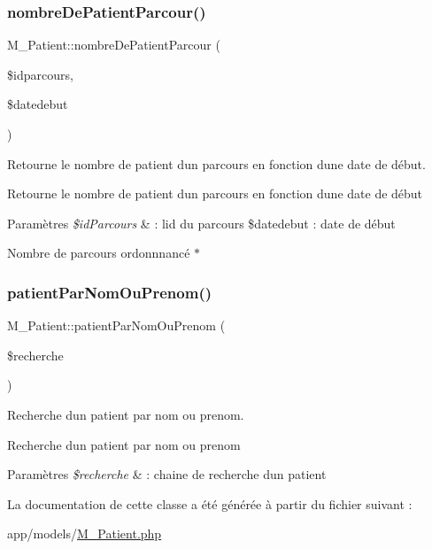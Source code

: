 \subsubsection{\texorpdfstring{nombre\+De\+Patient\+Parcour()}{nombreDePatientParcour()}}
{\footnotesize\ttfamily M\+\_\+\+Patient\+::nombre\+De\+Patient\+Parcour (\begin{DoxyParamCaption}\item[{}]{\$idparcours,  }\item[{}]{\$datedebut }\end{DoxyParamCaption})}



Retourne le nombre de patient d\textquotesingle{}un parcours en fonction d\textquotesingle{}une date de début. 

Retourne le nombre de patient d\textquotesingle{}un parcours en fonction d\textquotesingle{}une date de début 
\begin{DoxyParams}{Paramètres}
{\em \$id\+Parcours} & \+: l\textquotesingle{}id du parcours \$datedebut \+: date de début \\
\hline
\end{DoxyParams}
Nombre de parcours ordonnnancé $\ast$ \mbox{\label{class_m___patient_ae756ff875e1058f4259c39f8ab801a29}} 
\subsubsection{\texorpdfstring{patient\+Par\+Nom\+Ou\+Prenom()}{patientParNomOuPrenom()}}
{\footnotesize\ttfamily M\+\_\+\+Patient\+::patient\+Par\+Nom\+Ou\+Prenom (\begin{DoxyParamCaption}\item[{}]{\$recherche }\end{DoxyParamCaption})}



Recherche d\textquotesingle{}un patient par nom ou prenom. 

Recherche d\textquotesingle{}un patient par nom ou prenom 
\begin{DoxyParams}{Paramètres}
{\em \$recherche} & \+: chaine de recherche d\textquotesingle{}un patient \\
\hline
\end{DoxyParams}


La documentation de cette classe a été générée à partir du fichier suivant \+:\begin{DoxyCompactItemize}
\item 
app/models/\hyperlink{_m___patient_8php}{M\+\_\+\+Patient.\+php}\end{DoxyCompactItemize}
